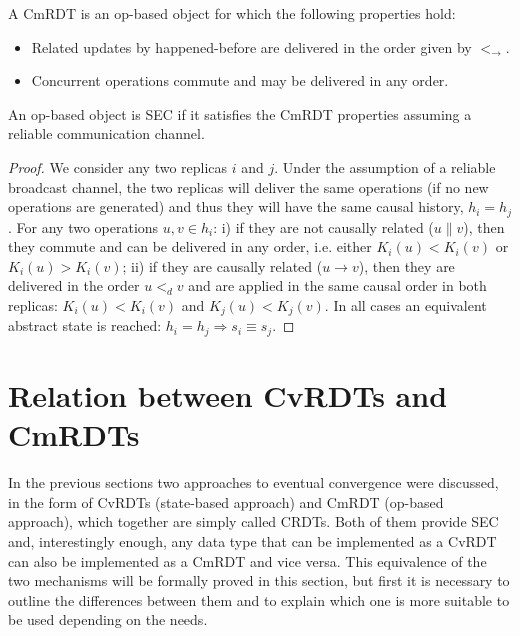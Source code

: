 \begin{definition}
\begin{itshape}
A CmRDT is an op-based object for which the following properties hold:
\begin{itemize}
  \item Related updates by happened-before are delivered in the order given by
  $<_{\rightarrow}$.
  \item Concurrent operations commute and may be delivered in any order.
\end{itemize}
\end{itshape}
\end{definition}

\begin{theorem}
\begin{itshape}
An op-based object is SEC if it satisfies the CmRDT properties assuming a
reliable communication channel.
\end{itshape}
\end{theorem}

\begin{proof}
We consider any two replicas $i$ and $j$. Under the assumption of a reliable
broadcast channel, the two replicas will deliver the same operations (if no new
operations are generated) and thus they will have the same causal history,
$h_{i} = h_{j}$. For any two operations $u, v \in h_{i}$: i) if they are not
causally related ($u \parallel v$), then they commute and can be delivered in
any order, i.e. either $K_{i}(u) < K_{i}(v)$ or $K_{i}(u) > K_{i}(v)$; ii) if
they are causally related ($u \rightarrow v$), then they are delivered in the
order $u <_{d} v$ and are applied in the same causal order in both replicas:
$K_{i}(u) < K_{i}(v)$ and $K_{j}(u) < K_{j}(v)$. In all cases an equivalent
abstract state is reached: $h_{i} = h_{j} \Longrightarrow s_{i} \equiv s_{j}$.
\end{proof}

\section{Relation between CvRDTs and CmRDTs}
\label{sec:relation_between_cvrdts_and_cmrdts}

In the previous sections two approaches to eventual convergence were discussed,
in the form of CvRDTs (state-based approach) and CmRDT (op-based approach),
which together are simply called CRDTs. Both of them provide SEC and,
interestingly enough, any data type that can be implemented as a CvRDT can also
be implemented as a CmRDT and vice versa. This equivalence of the two mechanisms
will be formally proved in this section, but first it is necessary to outline
the differences between them and to explain which one is more suitable to be
used depending on the needs.

